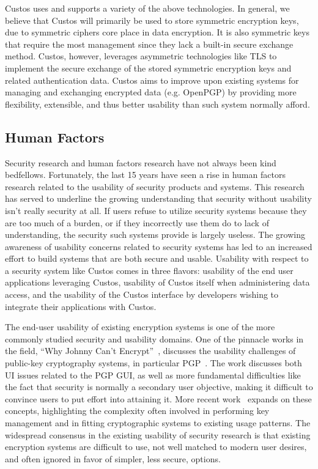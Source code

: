 Custos uses and supports a variety of the above technologies. In
general, we believe that Custos will primarily be used to store
symmetric encryption keys, due to symmetric ciphers core place in data
encryption. It is also symmetric keys that require the most management
since they lack a built-in secure exchange method. Custos, however,
leverages asymmetric technologies like TLS to implement the secure
exchange of the stored symmetric encryption keys and related
authentication data. Custos aims to improve upon existing systems for
managing and exchanging encrypted data (e.g. OpenPGP) by providing
more flexibility, extensible, and thus better usability than such
system normally afford.

\subsection{Human Factors}

Security research and human factors research have not always been kind
bedfellows. Fortunately, the last 15 years have seen a rise in human
factors research related to the usability of security products and
systems. This research has served to underline the growing
understanding that security without usability isn't really security at
all. If users refuse to utilize security systems because they are too
much of a burden, or if they incorrectly use them do to lack of
understanding, the security such systems provide is largely
useless. The growing awareness of usability concerns related to
security systems has led to an increased effort to build systems that
are both secure and usable. Usability with respect to a security
system like Custos comes in three flavors: usability of the end user
applications leveraging Custos, usability of Custos itself when
administering data access, and the usability of the Custos interface
by developers wishing to integrate their applications with Custos.

The end-user usability of existing encryption systems is one of the
more commonly studied security and usability domains. One of the
pinnacle works in the field, ``Why Johnny Can't
Encrypt''~\cite{Whitten1998, Whitten1998}, discusses the usability
challenges of public-key cryptography systems, in particular
PGP~\cite{openpgp}. The work discusses both UI issues related to the
PGP GUI, as well as more fundamental difficulties like the fact that
security is normally a secondary user objective, making it difficult
to convince users to put effort into attaining it. More recent
work~\cite{Sweikata2009, Furnell2006, Ibrahim2010} expands on these
concepts, highlighting the complexity often involved in performing key
management and in fitting cryptographic systems to existing usage
patterns. The widespread consensus in the existing usability of
security research is that existing encryption systems are difficult to
use, not well matched to modern user desires, and often ignored in
favor of simpler, less secure, options.

